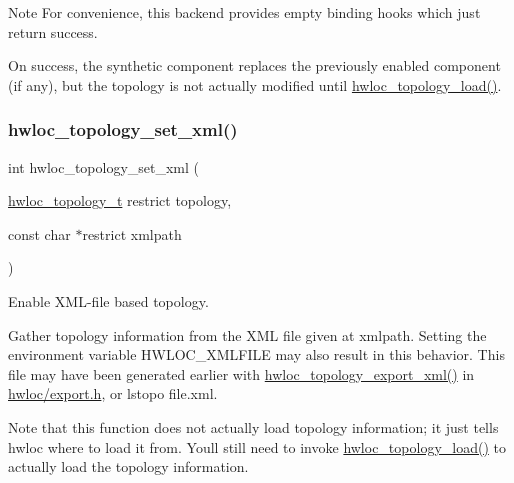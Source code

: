 \begin{DoxyNote}{Note}
For convenience, this backend provides empty binding hooks which just return success.

On success, the synthetic component replaces the previously enabled component (if any), but the topology is not actually modified until \hyperlink{a00186_gabdf58d87ad77f6615fccdfe0535ff826}{hwloc\+\_\+topology\+\_\+load()}. 
\end{DoxyNote}
\mbox{\label{a00192_ga879439b7ee99407ee911b3ac64e9a25e}} 
\subsubsection{\texorpdfstring{hwloc\+\_\+topology\+\_\+set\+\_\+xml()}{hwloc\_topology\_set\_xml()}}
{\footnotesize\ttfamily int hwloc\+\_\+topology\+\_\+set\+\_\+xml (\begin{DoxyParamCaption}\item[{\hyperlink{a00186_ga9d1e76ee15a7dee158b786c30b6a6e38}{hwloc\+\_\+topology\+\_\+t} restrict}]{topology,  }\item[{const char $\ast$restrict}]{xmlpath }\end{DoxyParamCaption})}



Enable X\+M\+L-\/file based topology. 

Gather topology information from the X\+ML file given at {\ttfamily xmlpath}. Setting the environment variable H\+W\+L\+O\+C\+\_\+\+X\+M\+L\+F\+I\+LE may also result in this behavior. This file may have been generated earlier with \hyperlink{a00206_ga333f79975b4eeb28a3d8fad3373583ce}{hwloc\+\_\+topology\+\_\+export\+\_\+xml()} in \hyperlink{a00128_source}{hwloc/export.\+h}, or lstopo file.\+xml.

Note that this function does not actually load topology information; it just tells hwloc where to load it from. You\textquotesingle{}ll still need to invoke \hyperlink{a00186_gabdf58d87ad77f6615fccdfe0535ff826}{hwloc\+\_\+topology\+\_\+load()} to actually load the topology information.

